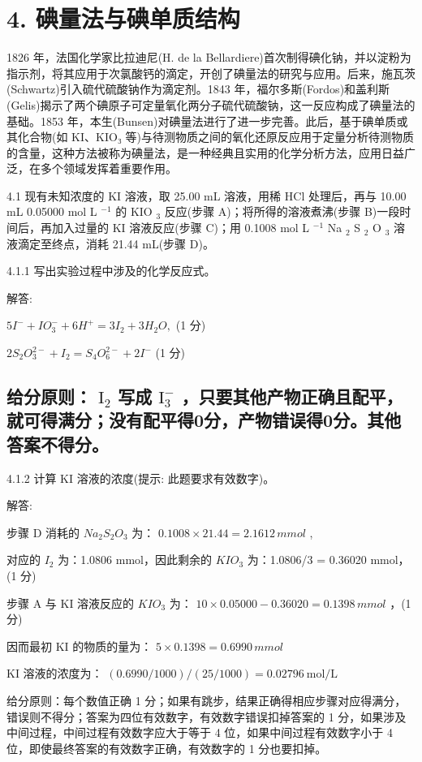 \section*{4. 碘量法与碘单质结构}
1826 年，法国化学家比拉迪尼(H. de la Bellardiere)首次制得碘化钠，并以淀粉为指示剂，将其应用于次氯酸钙的滴定，开创了碘量法的研究与应用。后来，施瓦茨(Schwartz)引入硫代硫酸钠作为滴定剂。1843 年，福尔多斯(Fordos)和盖利斯(Gelis)揭示了两个碘原子可定量氧化两分子硫代硫酸钠，这一反应构成了碘量法的基础。1853 年，本生(Bunsen)对碘量法进行了进一步完善。此后，基于碘单质或其化合物(如 KI、KIO₃ 等)与待测物质之间的氧化还原反应用于定量分析待测物质的含量，这种方法被称为碘量法，是一种经典且实用的化学分析方法，应用日益广泛，在多个领域发挥着重要作用。

4.1 现有未知浓度的 KI 溶液，取 25.00 mL 溶液，用稀 HCl 处理后，再与 10.00 mL 0.05000 mol L $^{-1}$ 的 KIO $_{3}$ 反应(步骤 A)；将所得的溶液煮沸(步骤 B)一段时间后，再加入过量的 KI 溶液反应(步骤 C)；用 0.1008 mol L $^{-1}$ Na $_{2}$ S $_{2}$ O $_{3}$ 溶液滴定至终点，消耗 21.44 mL(步骤 D)。

4.1.1 写出实验过程中涉及的化学反应式。

解答:

$5I^{-} + IO_{3}^{-} + 6H^{+} = 3I_{2} + 3H_{2}O,$ (1 分)

$2S_{2}O_{3}^{2-} + I_{2} = S_{4}O_{6}^{2-} + 2I^{-}$ (1 分)

\subsection*{给分原则： $\mathrm{I}_2$ 写成 $\mathrm{I}_3^-$ ，只要其他产物正确且配平，就可得满分；没有配平得0分，产物错误得0分。其他答案不得分。}

4.1.2 计算 KI 溶液的浓度(提示: 此题要求有效数字)。

解答:

步骤 D 消耗的 $Na_{2}S_{2}O_{3}$ 为： $0.1008 \times 21.44 = 2.1612 \, mmol$ ,

对应的 $I_{2}$ 为：1.0806 mmol，因此剩余的 $KIO_{3}$ 为：1.0806/3 = 0.36020 mmol，(1 分)

步骤 A 与 KI 溶液反应的 $KIO_{3}$ 为： $10 \times 0.05000 - 0.36020 = 0.1398 \, mmol$ ，(1 分)

因而最初 KI 的物质的量为： $5 \times 0.1398 = 0.6990 \, mmol$

KI 溶液的浓度为： $(0.6990/1000)/(25/1000)=0.02796\ \text{mol/L}$

给分原则：每个数值正确 1 分；如果有跳步，结果正确得相应步骤对应得满分，错误则不得分；答案为四位有效数字，有效数字错误扣掉答案的 1 分，如果涉及中间过程，中间过程有效数字应大于等于 4 位，如果中间过程有效数字小于 4 位，即使最终答案的有效数字正确，有效数字的 1 分也要扣掉。

